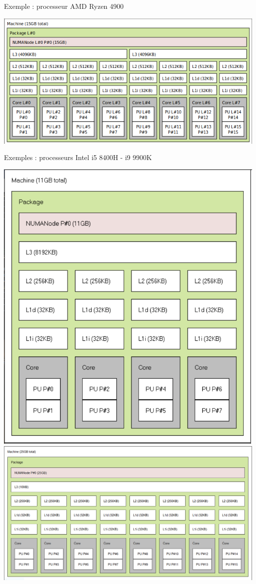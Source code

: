 \documentclass{beamer}
\begin{document}
\begin{frame}

Exemple : processeur AMD Ryzen 4900
\begin{center}
	\includegraphics[scale=0.32]{../../Images/lstopo_ryzen_4900}
\end{center}

Exemples : processeurs Intel i5 8400H - i9 9900K
\begin{center}
	\includegraphics[scale=0.23]{../../Images/topo_i5}
	\includegraphics[scale=0.23]{../../Images/topo_i9}
\end{center}


\end{frame}
\end{document}

